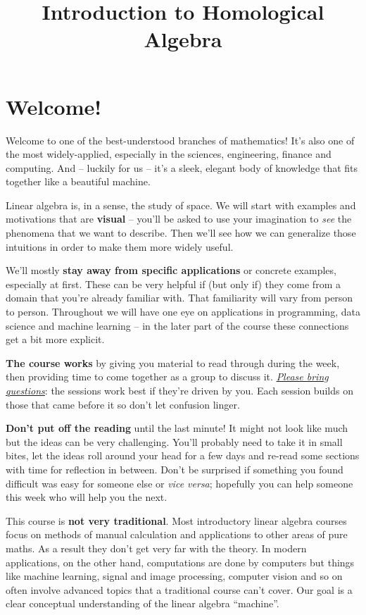 \documentclass[oneside,english]{amsbook}
\numberwithin{section}{chapter}
\theoremstyle{plain}
\theoremstyle{definition}
\begin{document}
	
	\title{Introduction to Homological Algebra}
	
	\maketitle
	
	\tableofcontents
	
	\chapter*{Welcome!}

Welcome to one of the best-understood branches of mathematics! It's also
one of the most widely-applied, especially in the sciences, engineering,
finance and computing. And -- luckily for us -- it's a sleek, elegant
body of knowledge that fits together like a beautiful machine.

Linear algebra is, in a sense, the study of space. We will start with
examples and motivations that are \textbf{visual} -- you'll be asked to
use your imagination to \emph{see} the phenomena that we want to
describe. Then we'll see how we can generalize those intuitions in order
to make them more widely useful.

We'll mostly \textbf{stay away from specific applications} or concrete
examples, especially at first. These can be very helpful if (but only
if) they come from a domain that you're already familiar with. That
familiarity will vary from person to person. Throughout we will have one
eye on applications in programming, data science and machine learning --
in the later part of the course these connections get a bit more
explicit.

\textbf{The course works} by giving you material to read through during
the week, then providing time to come together as a group to discuss it.
\emph{\ul{Please bring questions}}: the sessions work best if they're
driven by you. Each session builds on those that came before it so don't
let confusion linger.

\textbf{Don't put off the reading} until the last minute! It might not
look like much but the ideas can be very challenging. You'll probably
need to take it in small bites, let the ideas roll around your head for
a few days and re-read some sections with time for reflection in
between. Don't be surprised if something you found difficult was easy
for someone else or \emph{vice versa}; hopefully you can help someone
this week who will help you the next.

This course is \textbf{not very traditional}. Most introductory linear
algebra courses focus on methods of manual calculation and applications
to other areas of pure maths. As a result they don't get very far with
the theory. In modern applications, on the other hand, computations are
done by computers but things like machine learning, signal and image
processing, computer vision and so on often involve advanced topics that
a traditional course can't cover. Our goal is a clear conceptual
understanding of the linear algebra ``machine''.
\end{document}
